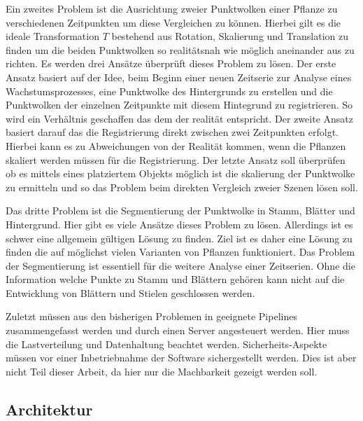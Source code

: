 \documentclass[12pt,titlepage]{article}
\begin{document}
Ein zweites Problem ist die Ausrichtung zweier Punktwolken einer Pflanze zu verschiedenen Zeitpunkten um diese Vergleichen zu können. 
Hierbei gilt es die ideale Transformation $T$ bestehend aus Rotation, Skalierung und Translation zu finden um die beiden Punktwolken so realitätsnah wie möglich aneinander aus zu richten.
Es werden drei Ansätze überprüft dieses Problem zu lösen. 
Der erste Ansatz basiert auf der Idee, beim Beginn einer neuen Zeitserie zur Analyse eines Wachstumsprozesses, eine Punktwolke des Hintergrunds zu erstellen und die Punktwolken der einzelnen Zeitpunkte mit diesem Hintegrund zu registrieren. So wird ein Verhältnis geschaffen das dem der realität entspricht.
Der zweite Ansatz basiert darauf das die Registrierung direkt zwischen zwei Zeitpunkten erfolgt. Hierbei kann es zu Abweichungen von der Realität kommen, wenn die Pflanzen skaliert werden müssen für die Registrierung.
Der letzte Ansatz soll überprüfen ob es mittels eines platziertem Objekts möglich ist die skalierung der Punktwolke zu ermitteln und so das Problem beim direkten Vergleich zweier Szenen lösen soll.

Das dritte Problem ist die Segmentierung der Punktwolke in Stamm, Blätter und Hintergrund. Hier gibt es viele Ansätze dieses Problem zu lösen. Allerdings ist es schwer eine allgemein gültigen Lösung zu finden. 
Ziel ist es daher eine Lösung zu finden die auf möglichst vielen Varianten von Pflanzen funktioniert. 
Das Problem der Segmentierung ist essentiell für die weitere Analyse einer Zeitserien. Ohne die Information welche Punkte zu Stamm und Blättern gehören kann nicht auf die Entwicklung von Blättern und Stielen geschlossen werden.

Zuletzt müssen aus den bisherigen Problemen in geeignete Pipelines zusammengefasst werden und durch einen Server angesteuert werden. Hier muss die Lastverteilung und Datenhaltung beachtet werden. 
Sicherheits-Aspekte müssen vor einer Inbetriebnahme der Software sichergestellt werden. Dies ist aber nicht Teil dieser Arbeit, da hier nur die Machbarkeit gezeigt werden soll.

\subsection{Architektur}
\label{sec:realisierung:architektur}
\end{document}
